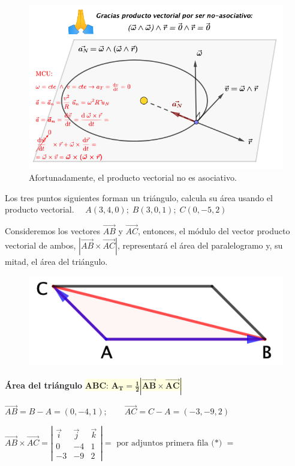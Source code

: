 \begin{figure}[H]
	\centering
	\includegraphics[width=.9\textwidth]{imagenes/imagenes09/T09IM22.png}
	\caption*{Afortunadamente, el producto vectorial no es asociativo.}
	\end{figure}
	
\begin{ejem}
Los tres puntos siguientes forman un triángulo, calcula su área usando el producto vectorial.  $\quad A(3,4,0);\; B(3,0,1); \; C(0,-5,2)$	
\end{ejem}
\begin{multicols}{2}
Consideremos los vectores $\overrightarrow{AB}$ y $\overrightarrow{AC}$, entonces, el módulo del vector producto vectorial de ambos, $|\overrightarrow{AB} \times \overrightarrow{AC}|$, representará el área del paralelogramo y, su mitad, el área del triángulo.

\begin{figure}[H]
	\centering
	\includegraphics[width=.5\textwidth]{imagenes/imagenes09/T09IM23.png}
	\end{figure}
\end{multicols}

\noindent \textbf{Área del triángulo}  \colorbox{LightYellow}{$\boldsymbol{ABC}$: $\boldsymbol{ A_T=\frac 1 2 |\overrightarrow{AB} \times \overrightarrow{AC}| }$}

\noindent $\overrightarrow{AB}=B-A=(0,-4,1);\qquad \overrightarrow{AC}=C-A=(-3,-9,2)$

\noindent $\overrightarrow{AB} \times \overrightarrow{AC}= \left| \begin{matrix}  \vec i & \vec j & \vec k \\0&-4&1\\-3&-9&2 \end{matrix} \right|= \text{ por adjuntos primera fila (*) }=$

